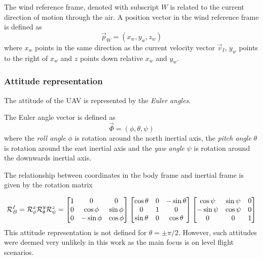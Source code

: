 \begin{definition}
    The wind reference frame, denoted with subscript $W$ is related to the current direction of motion
    through the air.
    A position vector in the wind reference frame is defined as
    \begin{equation}
        \vec{p}_W = (x_w, y_w, z_w)
    \end{equation}
    where $x_w$ points in the same direction as the current velocity vector $\vec{v}_I$, 
    $y_w$ points to the right of $x_w$ and $z$ points down relative $x_w$ and $y_w$.
\end{definition}

\subsubsection{Attitude representation}
The attitude of the UAV is represented by the \textit{Euler angles}. 

\begin{definition}
The Euler angle vector is defined as
\begin{equation}
    \vec{\Phi}=(\phi, \theta, \psi)
\end{equation}
where the \textit{roll angle} $\phi$ is rotation around the north inertial axis, 
the \textit{pitch angle} $\theta$ is rotation around the east inertial axis and
the \textit{yaw angle} $\psi$ is rotation around the downwards inertial axis.
\end{definition}

The relationship between coordinates in the body frame and inertial frame is given
 by the rotation matrix

\begin{equation}\label{eq:r_i_b}
\mathcal{R}^I_B = \mathcal{R}^x_\phi\mathcal{R}^y_\theta\mathcal{R}^z_\psi\\
=
\begin{bmatrix}
    1 & 0 & 0 \\
    0 & \cos\phi & \sin\phi \\
    0 & -\sin\phi & \cos\phi
\end{bmatrix}
\begin{bmatrix}
    \cos\theta & 0 & -\sin\theta \\
    0 & 1 & 0 \\
    \sin\theta & 0 & \cos\theta
\end{bmatrix}      
\begin{bmatrix}
    \cos\psi & \sin\psi & 0 \\
    -\sin\psi & \cos\psi & 0 \\
    0 & 0 & 1
\end{bmatrix}
\end{equation}  
This attitude representation is not defined for $\theta=\pm\pi/2$. However, such attitudes
 were deemed very unlikely in this work as the main focus is on level flight scenarios.

